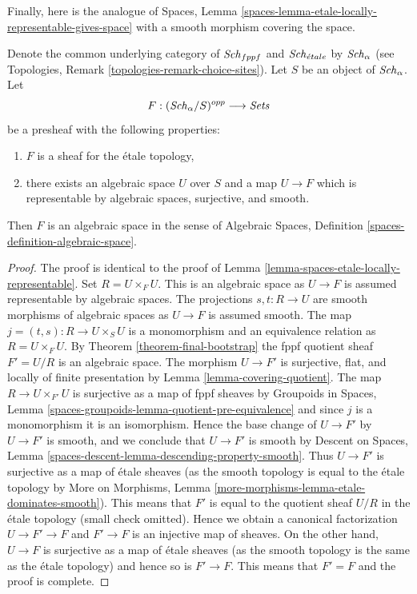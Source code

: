 \noindent
Finally, here is the analogue of
Spaces, Lemma \ref{spaces-lemma-etale-locally-representable-gives-space}
with a smooth morphism covering the space.

\begin{lemma}
\label{lemma-spaces-smooth-locally-representable}
Denote the common underlying category of $\mathit{Sch}_{fppf}$ and $\mathit{Sch}_{\acute{e}tale}$ by
$\mathit{Sch}_\alpha$ (see Topologies, Remark \ref{topologies-remark-choice-sites}).
Let $S$ be an object of $\mathit{Sch}_\alpha$. Let
$$
F : (\mathit{Sch}_\alpha/S)^{opp} \longrightarrow \textit{Sets}
$$
be a presheaf with the following properties:
\begin{enumerate}
\item $F$ is a sheaf for the \'etale topology,
\item there exists an algebraic space $U$ over $S$
and a map $U \to F$ which is representable by
algebraic spaces, surjective, and smooth.
\end{enumerate}
Then $F$ is an algebraic space in the sense of
Algebraic Spaces, Definition \ref{spaces-definition-algebraic-space}.
\end{lemma}

\begin{proof}
The proof is identical to the proof of
Lemma \ref{lemma-spaces-etale-locally-representable}.
Set $R = U \times_F U$. This is an algebraic space as $U \to F$ is assumed
representable by algebraic spaces. The projections $s, t : R \to U$ are
smooth morphisms of algebraic spaces as $U \to F$ is assumed smooth.
The map $j = (t, s) : R \to U \times_S U$ is a monomorphism and an
equivalence relation as $R = U \times_F U$. By
Theorem \ref{theorem-final-bootstrap}
the fppf quotient sheaf $F' = U/R$ is an algebraic space.
The morphism $U \to F'$ is surjective, flat, and locally of finite
presentation by Lemma \ref{lemma-covering-quotient}.
The map $R \to U \times_{F'} U$ is surjective as a map of fppf
sheaves by Groupoids in Spaces, Lemma
\ref{spaces-groupoids-lemma-quotient-pre-equivalence}
and since $j$ is a monomorphism it is an isomorphism.
Hence the base change of $U \to F'$ by $U \to F'$ is smooth,
and we conclude that $U \to F'$ is smooth by
Descent on Spaces, Lemma \ref{spaces-descent-lemma-descending-property-smooth}.
Thus $U \to F'$ is surjective as a map of \'etale sheaves (as the
smooth topology is equal to the \'etale topology by
More on Morphisms, Lemma \ref{more-morphisms-lemma-etale-dominates-smooth}).
This means that $F'$ is equal to the quotient sheaf $U/R$
in the \'etale topology (small check omitted). Hence we obtain
a canonical factorization $U \to F' \to F$ and $F' \to F$ is an injective
map of sheaves. On the other hand, $U \to F$ is surjective as a map
of \'etale sheaves (as the smooth topology is the same as the
\'etale topology) and hence so is $F' \to F$. This means that $F' = F$
and the proof is complete.
\end{proof}













